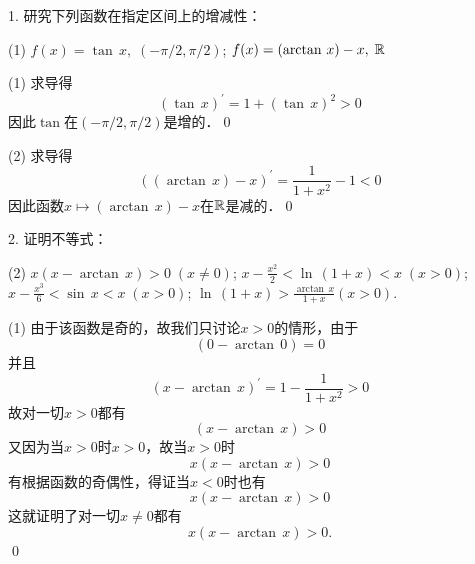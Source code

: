 \exercise

1. 研究下列函数在指定区间上的增减性：
\begin{tasks}(1)
    \task $f(x) = \tan \, x , \; (-\pi/2,\pi/2)$;
    \task $f(x) = \left(\arctan \, x\right) - x, \; \mathbb{R}$
\end{tasks}

(1) \solve 求导得
\begin{equation}
    \left(\tan \, x\right)^\prime = 1 + \left(\tan \, x\right)^2 > 0
\end{equation}
因此$\tan$在$(-\pi/2, \pi/2)$是增的．\qed\bigskip

(2) \solve 求导得
\begin{equation}
    \left(\left(\arctan \, x\right) - x\right)^\prime = \frac{1}{1+x^2} - 1 < 0
\end{equation}
因此函数$x \mapsto \left(\arctan \, x\right) - x$在$\mathbb{R}$是减的．\qed\bigskip

2. 证明不等式：
\begin{tasks}(2)
    \task $x(x-\arctan \, x) > 0 \; (x \neq 0)$;
    \task $x - \displaystyle\frac{x^2}{2}<\ln \, \left(1+x\right)<x \; (x>0)$;
    \task $x-\displaystyle\frac{x^3}{6}<\sin \, x < x \; (x > 0)$;
    \task $\ln \, \left(1+x\right)>\displaystyle\frac{\arctan \, x}{1+x} \left(x>0\right)$.
\end{tasks}

(1) \prove 由于该函数是奇的，故我们只讨论$x > 0$的情形，由于
\begin{equation}
    \left(0 - \arctan \, 0\right) = 0
\end{equation}
并且
\begin{equation}
    \left(x - \arctan \, x\right)^\prime = 1 - \frac{1}{1+x^2} > 0
\end{equation}
故对一切$x>0$都有
\begin{equation}
    \left(x - \arctan \, x\right) > 0
\end{equation}
又因为当$x > 0$时$x > 0$，故当$x > 0$时
\begin{equation}
    x \left(x - \arctan \, x\right) > 0
\end{equation}
有根据函数的奇偶性，得证当$x < 0$时也有
\begin{equation}
    x \left(x - \arctan \, x\right) > 0
\end{equation}
这就证明了对一切$x \neq 0$都有
\begin{equation}
    x \left(x - \arctan \, x\right) > 0.
\end{equation}
\qed\bigskip


